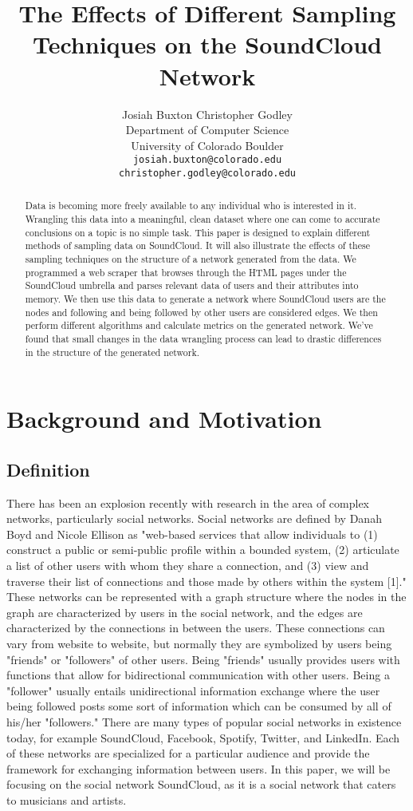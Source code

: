 \documentclass{article}
\title{The Effects of Different Sampling Techniques on the SoundCloud Network}
\author{
	Josiah Buxton \hspace{45pt} Christopher Godley\\
	Department of Computer Science\\
	University of Colorado Boulder\\
	\texttt{josiah.buxton@colorado.edu} \\
	\texttt{christopher.godley@colorado.edu} \\
}
\begin{document}
\maketitle

\begin{abstract}
  Data is becoming more freely available to any individual who is interested in it.  Wrangling this data into a meaningful, clean dataset where one can come to accurate conclusions on a topic is no simple task.  This paper is designed to explain different methods of sampling data on SoundCloud.  It will also illustrate the effects of these sampling techniques on the structure of a network generated from the data.  We programmed a web scraper that browses through the HTML pages under the SoundCloud umbrella and parses relevant data of users and their attributes into memory.  We then use this data to generate a network where SoundCloud users are the nodes and following and being followed by other users are considered edges.  We then perform different algorithms and calculate metrics on the generated network.  We've found that small changes in the data wrangling process can lead to drastic differences in the structure of the generated network.
\end{abstract}

\section{Background and Motivation}
\subsection{Definition}
There has been an explosion recently with research in the area of complex networks, particularly social networks.  Social networks are defined by Danah Boyd and Nicole Ellison as "web-based services that allow individuals to (1) construct a public or semi-public profile within a bounded system, (2) articulate a list of other users with whom they share a connection, and (3) view and traverse their list of connections and those made by others within the system [1]."  These networks can be represented with a graph structure where the nodes in the graph are characterized by users in the social network, and the edges are characterized by the connections in between the users.  These connections can vary from website to website, but normally they are symbolized by users being "friends" or "followers" of other users.  Being "friends" usually provides users with functions that allow for bidirectional communication with other users.  Being a "follower" usually entails unidirectional information exchange where the user being followed posts some sort of information which can be consumed by all of his/her "followers."  There are many types of popular social networks in existence today, for example SoundCloud, Facebook, Spotify, Twitter, and LinkedIn.  Each of these networks are specialized for a particular audience and provide the framework for exchanging information between users.  In this paper, we will be focusing on the social network SoundCloud, as it is a social network that caters to musicians and artists.
\end{document}
